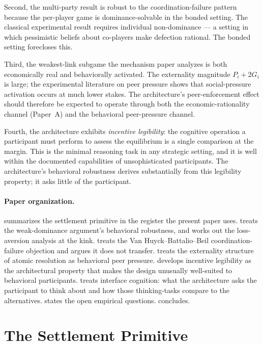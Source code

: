 \documentclass[11pt,a4paper]{article}
\theoremstyle{definition}
\theoremstyle{remark}
\newcommand{\pay}{P}
\newcommand{\cumval}{G}
\begin{document}
Second, the multi-party result is robust to the
\citet{vanhuyck_battalio_beil_1990} coordination-failure pattern
because the per-player game is dominance-solvable in the bonded
setting. The classical experimental result requires individual
non-dominance --- a setting in which pessimistic beliefs about
co-players make defection rational. The bonded setting forecloses
this.

Third, the weakest-link subgame the mechanism paper analyzes is
both economically real and behaviorally activated. The
externality magnitude $\pay_i + 2\cumval_i$ is large; the
experimental literature on peer pressure shows that social-pressure
activation occurs at much lower stakes. The architecture's
peer-enforcement effect should therefore be expected to operate
through both the economic-rationality channel (Paper~A) and the
behavioral peer-pressure channel.

Fourth, the architecture exhibits \emph{incentive legibility}: the
cognitive operation a participant must perform to assess the
equilibrium is a single comparison at the margin. This is the
minimal reasoning task in any strategic setting, and it is well
within the documented capabilities of unsophisticated participants.
The architecture's behavioral robustness derives substantially
from this legibility property; it asks little of the participant.

\paragraph{Paper organization.}
 summarizes the settlement primitive in the
register the present paper uses.
 treats the weak-dominance argument's
behavioral robustness, and works out the loss-aversion analysis
at the kink.
 treats the Van Huyck--Battalio--Beil
coordination-failure objection and argues it does not transfer.
 treats the externality structure of
atomic resolution as behavioral peer pressure.
 develops incentive legibility as the
architectural property that makes the design unusually
well-suited to behavioral participants.
 treats interface cognition: what the
architecture asks the participant to think about and how those
thinking-tasks compare to the alternatives.
 states the open empirical questions.
 concludes.

\section{The Settlement Primitive}
\label{sec:primitive}
\end{document}
